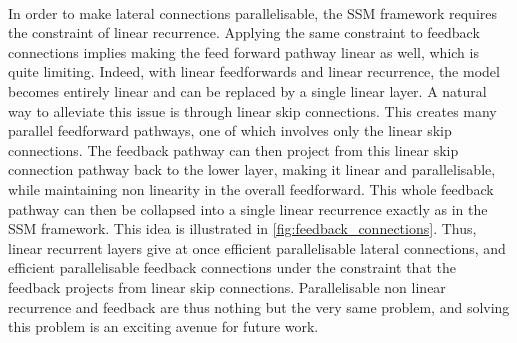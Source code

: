 
\paragraph{}In order to make lateral connections parallelisable, the SSM framework requires the constraint of linear recurrence. Applying the same constraint to feedback connections implies making the feed forward pathway linear as well, which is quite limiting. Indeed, with linear feedforwards and linear recurrence, the model becomes entirely linear and can be replaced by a single linear layer. A natural way to alleviate this issue is through linear skip connections. This creates many parallel feedforward pathways, one of which involves only the linear skip connections. The feedback pathway can then project from this linear skip connection pathway back to the lower layer, making it linear and parallelisable, while maintaining non linearity in the overall feedforward. This whole feedback pathway can then be collapsed into a single linear recurrence exactly as in the SSM framework. This idea is illustrated in \cref{fig:feedback_connections}.
%
Thus, linear recurrent layers give at once efficient parallelisable lateral connections, and efficient parallelisable feedback connections under the constraint that the feedback projects from linear skip connections. Parallelisable non linear recurrence and feedback are thus nothing but the very same problem, and solving this problem is an exciting avenue for future work.

